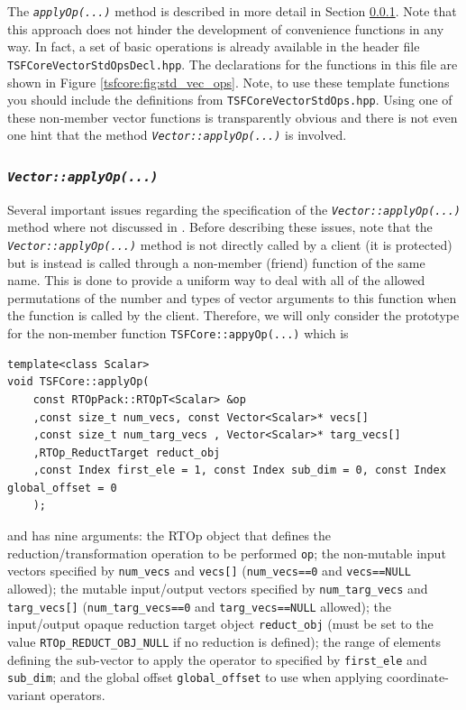 The \texttt{\textit{applyOp(\-...)}}  method is described in more detail
in Section \ref{tsfcore:sec:vec_apply_op}.  Note that this approach
does not hinder the development of convenience functions in any way.
In fact, a set of basic operations is already available in the header
file \texttt{TSFCore\-Vector\-Std\-Ops\-Decl.hpp}.  The declarations for the
functions in this file are shown in Figure
\ref{tsfcore:fig:std_vec_ops}.  Note, to use these template functions
you should include the definitions from
\texttt{TSFCore\-Vector\-Std\-Ops.hpp}.  Using one of these non-member
vector functions is transparently obvious and there is not even one
hint that the method
\texttt{\textit{Vector::applyOp(\-...)}} is involved.

%
\subsubsection{\texttt{\textit{Vector::applyOp(\-...)}}}
\label{tsfcore:sec:vec_apply_op}
%

Several important issues regarding the specification of the
\texttt{\textit{Vector::applyOp(\-...)}} method where not discussed in
\cite{ref:rtop_toms}.  Before describing these issues, note that the
\texttt{\textit{Vector\-::applyOp(\-...)}} method is not directly called
by a client (it is protected) but is instead is called through a
non-member (friend) function of the same name.  This is done to
provide a uniform way to deal with all of the allowed permutations of
the number and types of vector arguments to this function when the
function is called by the client.  Therefore, we will only consider
the prototype for the non-member function \texttt{TSFCore::appyOp(...)}
which is

{\tiny\begin{verbatim}
template<class Scalar>
void TSFCore::applyOp(
    const RTOpPack::RTOpT<Scalar> &op
    ,const size_t num_vecs, const Vector<Scalar>* vecs[]
    ,const size_t num_targ_vecs , Vector<Scalar>* targ_vecs[]
    ,RTOp_ReductTarget reduct_obj
    ,const Index first_ele = 1, const Index sub_dim = 0, const Index global_offset = 0
    );
\end{verbatim}}

and has nine arguments: the RTOp object that defines the
reduction/transformation operation to be performed \texttt{op}; the
non-mutable input vectors specified by \texttt{num\_vecs} and
\texttt{vecs[]} (\texttt{num\_vecs==0} and \texttt{vecs==NULL}
allowed); the mutable input/output vectors specified by
\texttt{num\_targ\_vecs} and \texttt{targ\-\_vecs[]}
(\texttt{num\_targ\_vecs==0} and \texttt{targ\_vecs==NULL} allowed);
the input/output opaque reduction target object \texttt{reduct\_obj}
(must be set to the value \texttt{RTOp\_REDUCT\_OBJ\_NULL} if no
reduction is defined); the range of elements defining the sub-vector
to apply the operator to specified by \texttt{first\_ele} and
\texttt{sub\_dim}; and the global offset \texttt{global\_offset} to
use when applying coordinate-variant operators.

